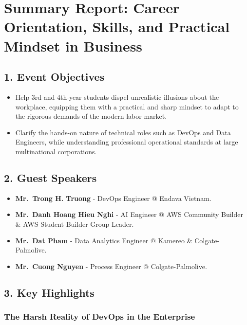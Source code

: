 \hypertarget{summary-report-career-orientation-skills-and-practical-mindset-in-business}{%
\section{Summary Report: Career Orientation, Skills, and Practical
Mindset in
Business}}

\hypertarget{event-objectives}{%
\subsection{1. Event Objectives}}

\begin{itemize}
\tightlist
\item
  Help 3rd and 4th-year students dispel unrealistic illusions about the
  workplace, equipping them with a practical and sharp mindset to adapt
  to the rigorous demands of the modern labor market.
\item
  Clarify the hands-on nature of technical roles such as DevOps and Data
  Engineers, while understanding professional operational standards at
  large multinational corporations.
\end{itemize}

\hypertarget{guest-speakers}{%
\subsection{2. Guest Speakers}}

\begin{itemize}
\tightlist
\item
  \textbf{Mr.~Trong H. Truong} - DevOps Engineer @ Endava Vietnam.
\item
  \textbf{Mr.~Danh Hoang Hieu Nghi} - AI Engineer @ AWS Community
  Builder \& AWS Student Builder Group Leader.
\item
  \textbf{Mr.~Dat Pham} - Data Analytics Engineer @ Kamereo \&
  Colgate-Palmolive.
\item
  \textbf{Mr.~Cuong Nguyen} - Process Engineer @ Colgate-Palmolive.
\end{itemize}

\hypertarget{key-highlights}{%
\subsection{3. Key Highlights}}

\hypertarget{the-harsh-reality-of-devops-in-the-enterprise}{%
\subsubsection{The Harsh Reality of DevOps in the
Enterprise}}

